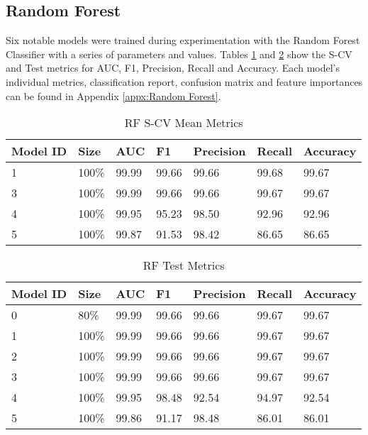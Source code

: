 \subsection{Random Forest}

Six notable models were trained during experimentation with the Random Forest Classifier with a series of parameters and values. Tables \ref{tab:rf-scv-metrics} and \ref{tab:rf-test-metrics} show the S-CV and Test metrics for AUC, F1, Precision, Recall and Accuracy. Each model's individual metrics, classification report, confusion matrix and feature importances can be found in Appendix \ref{appx:Random Forest}.
 
\begin{table}[H]
\centering
\caption{RF S-CV Mean Metrics}
\label{tab:rf-scv-metrics}
\begin{tabular}{|l|l|l|l|l|l|l|}
\hline
\textbf{Model ID} & \textbf{Size} & \textbf{AUC} & \textbf{F1} & \textbf{Precision} & \textbf{Recall} & \textbf{Accuracy}  \\ \hline
1 & 100\% & 99.99 & 99.66 & 99.66 & 99.68 & 99.67 \\ \hline
3 & 100\% & 99.99 & 99.66 & 99.66 & 	99.67 &	99.67 \\ \hline
4 & 100\% & 99.95 & 95.23 &	98.50 &	92.96 &	92.96 \\ \hline
5 & 100\% & 99.87 &	91.53 &	98.42 &	86.65 &	86.65 \\ \hline
\end{tabular}
\end{table}

\begin{table}[h]
\centering
\caption{RF Test Metrics}
\label{tab:rf-test-metrics}
\begin{tabular}{|l|l|l|l|l|l|l|}
\hline
\textbf{Model ID} & \textbf{Size} & \textbf{AUC} & \textbf{F1} & \textbf{Precision} & \textbf{Recall} & \textbf{Accuracy}  \\ \hline
0 & 80\% & 99.99 & 99.66 & 99.66 & 99.67 & 99.67 \\ \hline
1 & 100\% & 99.99 & 99.66 & 99.66 & 99.67 & 99.67 \\ \hline
2 & 100\% & 99.99 & 99.66 & 99.66 & 99.67 & 99.67 \\ \hline
3 & 100\% & 99.99 & 99.66 & 99.66 & 99.67 & 99.67 \\ \hline
4 & 100\% & 99.95 & 98.48 &	92.54 & 94.97 &	92.54 \\ \hline
5 & 100\% & 99.86 & 91.17 & 98.48 & 86.01 & 86.01 \\ \hline
\end{tabular}
\end{table}

